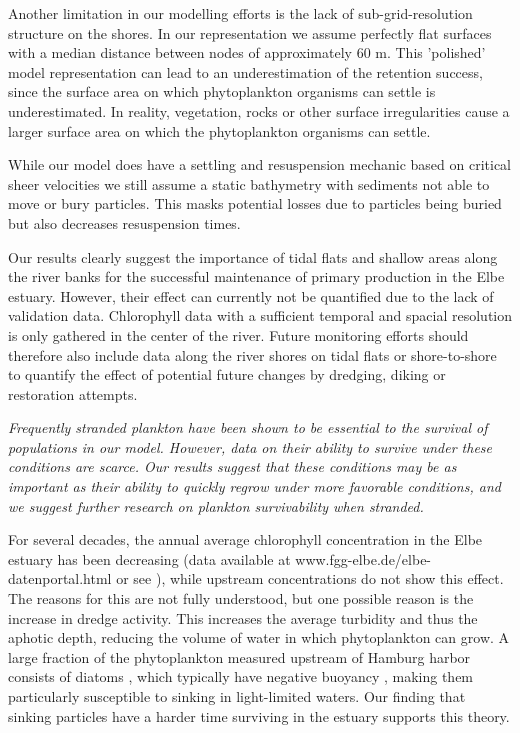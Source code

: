\documentclass[npg, manuscript]{copernicus}
\begin{document}
Another limitation in our modelling efforts is the lack of sub-grid-resolution structure on the shores.
In our representation we assume perfectly flat surfaces with a median distance between nodes of approximately 60 \unit{m}. 
This 'polished' model representation can lead to an underestimation of the retention success, since the surface area on which phytoplankton organisms can settle is underestimated.
In reality, vegetation, rocks or other surface irregularities cause a larger surface area on which the phytoplankton organisms can settle.

While our model does have a settling and resuspension mechanic based on critical sheer velocities we still assume a static bathymetry with sediments not able to move or bury particles. 
This masks potential losses due to particles being buried but also decreases resuspension times.




Our results clearly suggest the importance of tidal flats and shallow areas along the river banks for the successful maintenance of primary production in the Elbe estuary. 
However, their effect can currently not be quantified due to the lack of validation data.
Chlorophyll data with a sufficient temporal and spacial resolution is only gathered in the center of the river.
Future monitoring efforts should therefore also include data along the river shores on tidal flats or shore-to-shore to quantify the effect of potential future changes by dredging, diking or restoration attempts.

\textit{
    Frequently stranded plankton have been shown to be essential to the survival of populations in our model.
    However, data on their ability to survive under these conditions are scarce.
    Our results suggest that these conditions may be as important as their ability to quickly regrow under more favorable conditions, and we suggest further research on plankton survivability when stranded.
}

For several decades, the annual average chlorophyll concentration in the Elbe estuary has been decreasing (data available at www.fgg-elbe.de/elbe-datenportal.html or see \citep{Hardenbicker2014,Schol2014}), while upstream concentrations do not show this effect.
The reasons for this are not fully understood, but one possible reason is the increase in dredge activity.
This increases the average turbidity and thus the aphotic depth, reducing the volume of water in which phytoplankton can grow.
A large fraction of the phytoplankton measured upstream of Hamburg harbor consists of diatoms \citep{Muylaert1999}, which typically have negative buoyancy \citep{Passow1991}, making them particularly susceptible to sinking in light-limited waters.
Our finding that sinking particles have a harder time surviving in the estuary supports this theory.
\end{document}
